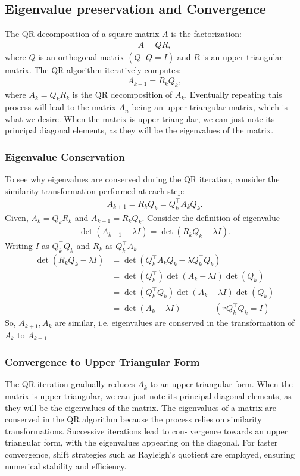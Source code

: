 \documentclass[12pt]{article}
\begin{document}
\subsection{Eigenvalue preservation and Convergence}

The QR decomposition of a square matrix $A$ is the factorization:
\begin{align*}
A = Q R,
\end{align*}
where $Q$ is an orthogonal matrix $(Q^{\top} Q = I)$ and $R$ is an upper triangular matrix. The QR algorithm iteratively computes:
\begin{align*}
A_{k+1} = R_k Q_k,
\end{align*}
where $A_k = Q_k R_k$ is the QR decomposition of $A_k$. 
Eventually repeating this process will lead to the matrix $A_n$ being an upper triangular matrix, which is what we desire. When the matrix is upper triangular, we can just note its principal diagonal elements, as they will be the eigenvalues of the matrix.
\subsubsection{Eigenvalue Conservation}

To see why eigenvalues are conserved during the QR iteration, consider the similarity transformation performed at each step:
\begin{align*}
A_{k+1} = R_k Q_k = Q_k^{\top} A_k Q_k.
\end{align*}
Given, $A_k = Q_k R_k$ and $A_{k+1} = R_k Q_k$. Consider the definition of eigenvalue
\begin{align*}
\det(A_{k+1} - \lambda I) = \det(R_k Q_k - \lambda I).
\end{align*}
Writing $I$ as $Q_k^{\top} Q_k$ and $R_k$ as $Q_k^{\top}A_k$
\begin{align*}
    \det(R_k Q_k - \lambda I)&=\det(Q_k^{\top}A_k Q_k - \lambda Q_k^{\top} Q_k)\\
    &= \det(Q_k^{\top})\det(A_k -\lambda I)\det(Q_k)\\
    &= \det(Q_k^{\top} Q_k)\det(A_k -\lambda I)\det(Q_k)\\
    &= \det(A_k -\lambda I)\quad \quad \quad \quad (\because Q_k^{\top}Q_k = I)
\end{align*}
So, $A_{k+1}, A_k$ are similar, i.e. eigenvalues are conserved in the transformation of $A_k$ to $A_{k+1}$

\subsubsection{Convergence to Upper Triangular Form}
The QR iteration gradually reduces $A_k$ to an upper triangular form. When the matrix is upper triangular, we can just note its principal diagonal elements, as they will be the eigenvalues of the matrix. The eigenvalues of a matrix are conserved in the QR algorithm because the
process relies on similarity transformations. Successive iterations lead to con-
vergence towards an upper triangular form, with the eigenvalues appearing on
the diagonal. For faster convergence, shift strategies such as Rayleigh’s quotient
are employed, ensuring numerical stability and efficiency.
\end{document}
